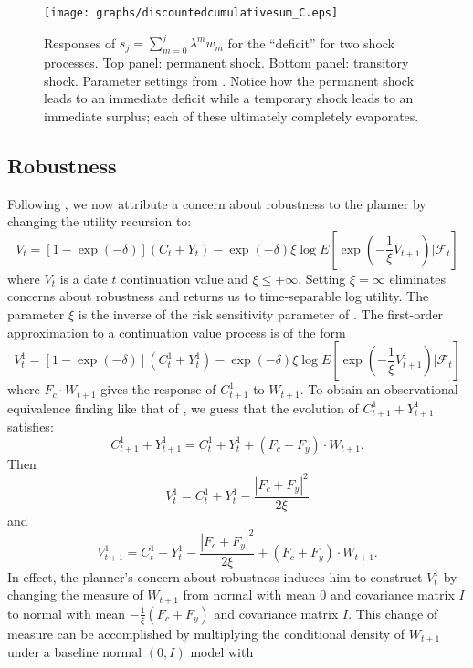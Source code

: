 \documentclass[12pt]{article}
\begin{document}
\begin{figure}[H]
\texttt{[image: graphs/discountedcumulativesum\_C.eps]}
\caption{Responses of $s_j = \sum_{m=0}^j \lambda^m w_m $  for the ``deficit'' for  two shock processes. Top panel: permanent shock.  Bottom panel: transitory shock.  Parameter settings from \cite{hst:1999}.  Notice how the permanent shock leads to an immediate deficit while a temporary shock
 leads to an immediate surplus; each of these ultimately completely evaporates.}\label{fig:PVresponses}
\end{figure}


\subsection{Robustness}

Following \citet{hst:1999}, we now  attribute  a concern about robustness to the planner by changing  the utility recursion to:
\[
V_t = [1 - \exp(-\delta)] (C_t+ Y_t) - \exp(-\delta)  \xi \log E\left[ \exp \left( - {\frac 1 \xi} V_{t+1} \right) \vert {\mathcal F}_t \right]
\]
where $V_t$ is a date $t$ continuation value and $\xi \leq + \infty$.  Setting $\xi = \infty$ eliminates concerns about robustness and returns us to  time-separable log utility.  The parameter $\xi$ is the inverse of the risk sensitivity parameter of \cite{hst:1999}.
The first-order approximation to a continuation value process is of the form
\[
V_t^1 = [1 - \exp(- \delta) ] (C_t^1 + Y_t^1)  - \exp(-\delta)  \xi \log E\left[ \exp \left( - {\frac 1 \xi} V_{t+1}^1 \right) \vert {\mathcal F}_t \right]
\]
where $F_c \cdot W_{t+1}$ gives the response of $C_{t+1}^1$ to $W_{t+1}$.
To obtain an observational equivalence finding like that of \cite{hst:1999}, we guess
 that the  evolution of $C_{t+1}^1 + Y_{t+1}^1$ satisfies:
\begin{equation} \label{consumptionevolve}
C_{t+1}^1 + Y_{t+1}^1 = C_{t}^1 + Y_{t}^1 + (F_c + F_y) \cdot W_{t+1} .
 \end{equation}
Then
\[
V_t^1 = C_t^1 + Y_t^1 - {\frac  {| F_c + F_y|^2} {2 \xi}}
\]
and
\[ V_{t+1}^1  =   C_{t}^1 + Y_{t}^1 - {\frac  {| F_c + F_y|^2} {2 \xi}}  + (F_c + F_y) \cdot W_{t+1} . \]
In effect, the planner's  concern about robustness induces him to construct $V_t^1$ by changing the measure of $W_{t+1}$ from
normal with mean $0$ and covariance matrix $I$ to
   normal  with mean $- {\frac 1 \xi} (F_c + F_y)$ and covariance matrix $I$.
 This change of measure can be accomplished by  multiplying the conditional density of $W_{t+1}$ under a baseline normal $(0,I)$ model with
\end{document}
